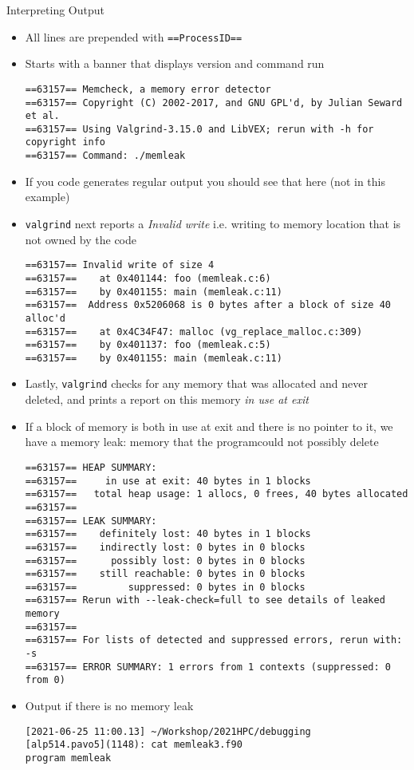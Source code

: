 \documentclass[10pt,t]{beamer}
\begin{document}
\begin{frame}{Interpreting Output}
  \begin{itemize}
    \item All lines are prepended with \lstinline|==ProcessID==|
    \item Starts with a banner that displays version and command run
      \begin{lstlisting}
==63157== Memcheck, a memory error detector
==63157== Copyright (C) 2002-2017, and GNU GPL'd, by Julian Seward et al.
==63157== Using Valgrind-3.15.0 and LibVEX; rerun with -h for copyright info
==63157== Command: ./memleak
      \end{lstlisting}
    \item If you code generates regular output you should see that here (not in this example)
    \item \lstinline|valgrind| next reports a \textit{Invalid write} i.e. writing to memory location that is not owned by the code
      \begin{lstlisting}
==63157== Invalid write of size 4
==63157==    at 0x401144: foo (memleak.c:6)
==63157==    by 0x401155: main (memleak.c:11)
==63157==  Address 0x5206068 is 0 bytes after a block of size 40 alloc'd
==63157==    at 0x4C34F47: malloc (vg_replace_malloc.c:309)
==63157==    by 0x401137: foo (memleak.c:5)
==63157==    by 0x401155: main (memleak.c:11)
      \end{lstlisting}
      \item Lastly, \lstinline|valgrind| checks for any memory that was allocated and never deleted, and prints a report on this memory \textit{in use at exit}
      \item If a block of memory is both in use at exit and there is no pointer to it, we have a memory leak: memory that the programcould not possibly delete
        \begin{lstlisting}
==63157== HEAP SUMMARY:
==63157==     in use at exit: 40 bytes in 1 blocks
==63157==   total heap usage: 1 allocs, 0 frees, 40 bytes allocated
==63157==
==63157== LEAK SUMMARY:
==63157==    definitely lost: 40 bytes in 1 blocks
==63157==    indirectly lost: 0 bytes in 0 blocks
==63157==      possibly lost: 0 bytes in 0 blocks
==63157==    still reachable: 0 bytes in 0 blocks
==63157==         suppressed: 0 bytes in 0 blocks
==63157== Rerun with --leak-check=full to see details of leaked memory
==63157==
==63157== For lists of detected and suppressed errors, rerun with: -s
==63157== ERROR SUMMARY: 1 errors from 1 contexts (suppressed: 0 from 0)
        \end{lstlisting}
      \item Output if there is no memory leak
        \begin{lstlisting}
[2021-06-25 11:00.13] ~/Workshop/2021HPC/debugging
[alp514.pavo5](1148): cat memleak3.f90
program memleak


\end{lstlisting}
\end{itemize}
\end{frame}
\end{document}
